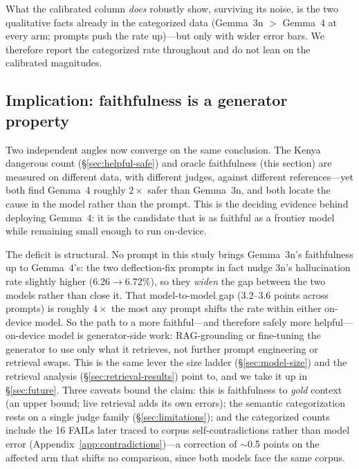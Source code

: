 What the calibrated column \emph{does} robustly show, surviving its noise, is
the two qualitative facts already in the categorized data (Gemma~3n $>$
Gemma~4 at every arm; prompts push the rate up)---but only with wider error
bars. We therefore report the categorized rate throughout and do not lean on
the calibrated magnitudes.

\subsection{Implication: faithfulness is a generator property}
\label{sec:faith-implication}

Two independent angles now converge on the same conclusion. The Kenya
dangerous count (\S\ref{sec:helpful-safe}) and oracle faithfulness (this
section) are measured on different data, with different judges, against
different references---yet both find Gemma~4 roughly $2\times$ safer than
Gemma~3n, and both locate the cause in the model rather than the prompt. This
is the deciding evidence behind deploying Gemma~4: it is the candidate that is
as faithful as a frontier model while remaining small enough to run
on-device.

The deficit is structural. No prompt in this study brings Gemma~3n's
faithfulness up to Gemma~4's: the two deflection-fix prompts in fact nudge
3n's hallucination rate slightly higher ($6.26\to6.72\%$), so they
\emph{widen} the gap between the two models rather than close it. That
model-to-model gap ($3.2$--$3.6$ points across prompts) is roughly $4\times$
the most any prompt shifts the rate within either on-device model. So the path to a more faithful---and therefore safely more
helpful---on-device model is generator-side work: RAG-grounding or fine-tuning
the generator to use only what it retrieves, not further prompt engineering or
retrieval swaps. This is the same lever the size ladder
(\S\ref{sec:model-size}) and the retrieval analysis
(\S\ref{sec:retrieval-results}) point to, and we take it up in
\S\ref{sec:future}. Three caveats bound the claim: this is faithfulness to
\emph{gold} context (an upper bound; live retrieval adds its own errors); the
semantic categorization rests on a single judge family
(\S\ref{sec:limitations}); and the categorized counts include the 16 FAILs
later traced to corpus self-contradictions rather than model error
(Appendix~\ref{app:contradictions})---a correction of $\sim$0.5 points on the
affected arm that shifts no comparison, since both models face the same
corpus.
